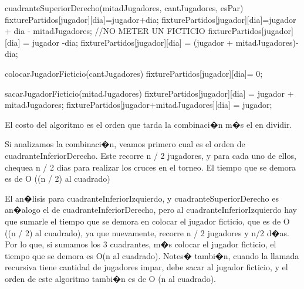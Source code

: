 \documentclass[11pt, a4paper, spanish]{article}
\begin{document}
\begin{algorithmic}
		\STATE	cuadranteSuperiorDerecho(mitadJugadores, cantJugadores, esPar)
						\STATE	fixturePartidos[jugador][dia]=jugador+dia;
					\ELSE
						\STATE	fixturePartidos[jugador][dia]=jugador + dia - mitadJugadores;  //NO METER UN FICTICIO
					\ENDIF
				\ENDFOR
			\ENDFOR
		\ELSE
						\STATE	fixturePartidos[jugador][dia] = jugador -dia;
					\ELSE
						\STATE	fixturePartidos[jugador][dia] = (jugador + mitadJugadores)-dia;
					\ENDIF
				\ENDFOR
			\ENDFOR
		\ENDIF	
	
		\STATE	colocarJugadorFicticio(cantJugadores)
					\STATE	fixturePartidos[jugador][dia]= 0;
				\ENDIF
			\ENDFOR
		\ENDFOR
		
		\STATE	sacarJugadorFicticio(mitadJugadores)
					\STATE	fixturePartidos[jugador][dia] = jugador + mitadJugadores; 
	 				\STATE	fixturePartidos[jugador+mitadJugadores][dia] = jugador;
				\ENDIF
			\ENDFOR
		\ENDFOR
	
			
\end{algorithmic}	

	El costo del algoritmo es el orden que tarda la combinaci�n m�s el en dividir.
	
	Si analizamos la combinaci�n, veamos primero cual es el orden de cuadranteInferiorDerecho. Este recorre n / 2 jugadores, y para cada uno de ellos, chequea n / 2 dias para realizar los cruces en el torneo. El tiempo que se demora es de O ((n / 2) al cuadrado)
	
	El an�lisis para cuadranteInferiorIzquierdo, y cuadranteSuperiorDerecho es an�alogo el de cuadranteInferiorDerecho, pero al cuadranteInferiorIzquierdo hay que sumarle el tiempo que se demora en colocar el jugador ficticio, que es de O ((n / 2) al cuadrado), ya que nuevamente, recorre n / 2 jugadores y n/2 d�as. 
	Por lo que, si sumamos los 3 cuadrantes, m�s colocar el jugador ficticio, el tiempo que se demora es O(n al cuadrado). Notes� tambi�n, cuando la llamada recursiva tiene cantidad de jugadores impar, debe sacar al jugador ficticio, y el orden de este algoritmo tambi�n es de O (n al cuadrado).
	
\end{document}
